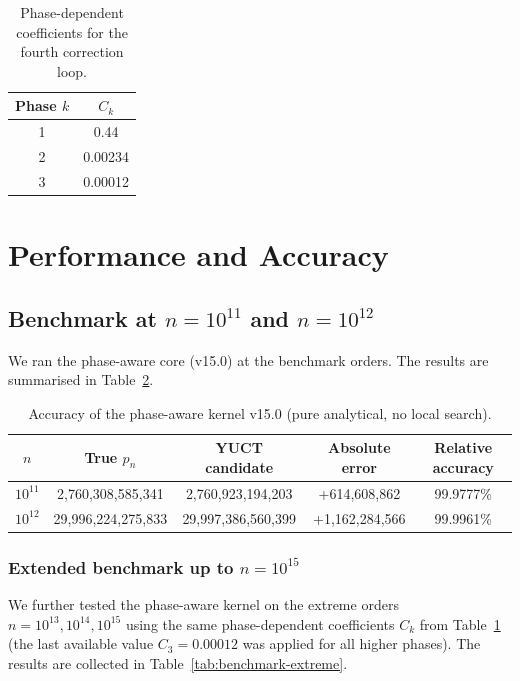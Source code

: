 \documentclass[12pt,a4paper]{article}
\begin{document}
	\begin{table}[htbp]
		\centering
		\caption{Phase-dependent coefficients for the fourth correction loop.}
		\label{tab:phase-coeffs}
		\begin{tabular}{c c}
			\toprule
			Phase \(k\) & \(C_k\) \\
			\midrule
			1 & 0.44 \\
			2 & 0.00234 \\
			3 & 0.00012 \\
			\bottomrule
		\end{tabular}
	\end{table}
	
	\section{Performance and Accuracy}
	\label{sec:performance}
	\subsection{Benchmark at \(n=10^{11}\) and \(n=10^{12}\)}
	We ran the phase-aware core (v15.0) at the benchmark orders. The results are summarised in Table~\ref{tab:benchmark-v15}.
	
	\begin{table}[htbp]
		\centering
		\caption{Accuracy of the phase-aware kernel v15.0 (pure analytical, no local search).}
		\label{tab:benchmark-v15}
		\begin{tabular}{c c c c c}
			\toprule
			\(n\) & True \(p_n\) & YUCT candidate & Absolute error & Relative accuracy \\
			\midrule
			\(10^{11}\) & 2,760,308,585,341 & 2,760,923,194,203 & +614,608,862 & 99.9777\% \\
			\(10^{12}\) & 29,996,224,275,833 & 29,997,386,560,399 & +1,162,284,566 & 99.9961\% \\
			\bottomrule
		\end{tabular}
	\end{table}
	
	\subsubsection{Extended benchmark up to \(n=10^{15}\)}
	
	We further tested the phase-aware kernel on the extreme orders
	\(n = 10^{13}, 10^{14}, 10^{15}\) using the same phase-dependent
	coefficients \(C_k\) from Table~\ref{tab:phase-coeffs} (the last
	available value \(C_3 = 0.00012\) was applied for all higher phases).
	The results are collected in Table~\ref{tab:benchmark-extreme}.
	
\end{document}
